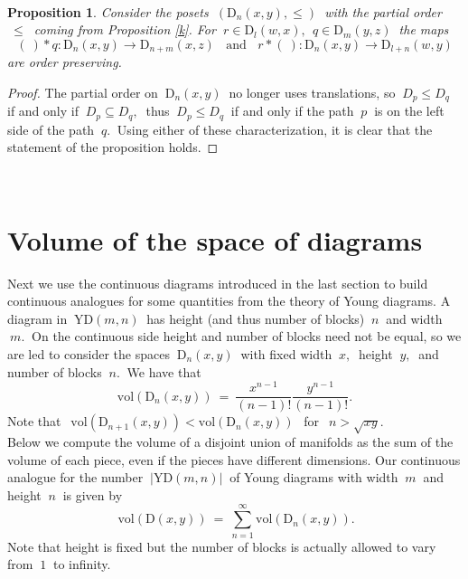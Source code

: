 \documentclass[10pt,leqeq]{article}
\newtheorem{prop}[thm]{Proposition} %
\begin{document}
\

\begin{prop}
{\em  Consider the posets $\ (\mathrm{D}_n(x,y), \leq) \ $ with the partial order $\ \leq \ $ coming from  Proposition \ref{k}. For $\ r \in \mathrm{D}_l(w,x), \
 \ q \in \mathrm{D}_m(y,z) \ $ the maps
$$(\ )\ast q: \mathrm{D}_n(x,y) \rightarrow \mathrm{D}_{n+m}(x,z)
\ \ \ \ \mbox{and} \ \ \ \ r\ast (\ ): \mathrm{D}_n(x,y) \rightarrow \mathrm{D}_{l+n}(w,y)$$
are order preserving.
}
\end{prop}


\begin{proof}
The partial order on $ \ \mathrm{D}_n(x,y) \ $  no longer  uses translations, so $\ D_p  \leq   D_q \ $ if and only if 
$\ D_p \subseteq   D_q, \ $ thus $\ D_p  \leq   D_q \ $ if and only if the path $\ p \ $ is on the left side of the path $\ q. \ $ Using either of these characterization, it is clear that the statement of the proposition holds.
\end{proof}



\



\section{Volume of the space of diagrams}




Next we use the continuous diagrams introduced in the last section to build continuous analogues for some quantities from the theory of Young diagrams. A diagram in $ \  \mathrm{YD}(m,n) \ $ has height (and thus number of blocks)  $\ n \ $ and  width  $\ m. \ $ 
On the continuous side height and number of blocks need not be equal, so we are led to consider the spaces $\ \mathrm{D}_n(x,y) \ $ with fixed width $\ x, \ $ height $\ y,\ $ and number of blocks $\ n. \ $ We have that
$$ \mathrm{vol}(\mathrm{D}_n(x,y))\ =  \ 
\frac{x^{n-1}}{(n-1)!}\frac{y^{n-1}}{(n-1)!}.$$
Note that  
$ \ \ \mathrm{vol}(\mathrm{D}_{n+1}(x,y)) < \mathrm{vol}(\mathrm{D}_{n}(x,y))\ \ $  for $\ \ n > \sqrt{xy}. \ $\\




Below we compute the volume of a disjoint union of manifolds as the sum of the volume of each piece, even if the pieces have different dimensions. 
Our continuous analogue for the number $ \ |\mathrm{YD}(m,n)\big| \ $ of Young diagrams with width $\ m \ $ and height $\ n \ $ is given by
$$ \ \mathrm{vol}(\mathrm{D}(x,y))\ =  \ \sum_{n=1}^{\infty}\mathrm{vol}(\mathrm{D}_n(x,y)).$$
Note that height is fixed but the number of blocks is actually allowed to vary
from $\ 1 \ $ to infinity. \\
\end{document}
